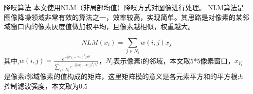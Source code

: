 \documentclass{beamer}
\begin{document}
  
  
\begin{frame}{降噪算法}
	本文使用NLM（非局部均值）降噪方式对图像进行处理。 NLM算法是图像降噪领域非常有效的算法之一，效率较高，实现简单。其思路是对像素的某邻域窗口内的像素灰度值做加权平均，且像素越相似，权重越大。
	  
	\begin{equation}
		NLM(x_{i})=\sum_{j\in N_{i}} w(i,j)x_{j}
	\end{equation}
	其中,\(w(i,j)=\frac{e^{-||x_{V_{i}}-x_{V_{j}}||^2/h^2}}{\sum_{j\in N_{i}}e^{-||x_{V_{i}}-x_{V_{j}}||^2/h^2}}\)，$N_{i}$表示像素i的邻域，本文取5*5像素窗口，$x_{V_{i}}$是像素i邻域像素的值构成的矩阵，这里矩阵模的意义是各元素平方和的平方根;$h$控制滤波强度，本文取为0.5
\end{frame}
  
  
  
\end{document}
